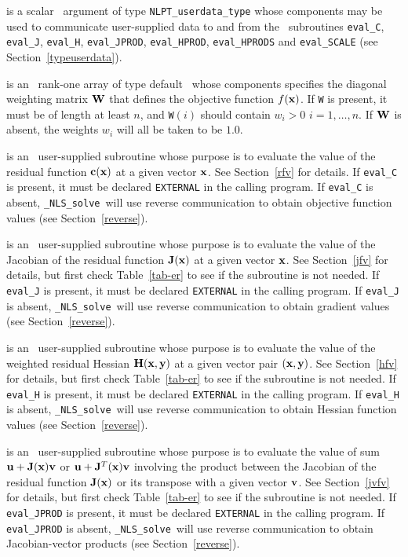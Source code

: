 \documentclass{galahad}
\newcommand{\packagename}{NLS}
\newcommand{\fullpackagename}{\libraryname\_\packagename}
\newcommand{\solver}{{\tt \fullpackagename\_solve}}
\begin{document}
\begin{description}
 is a scalar \intentinout\ argument of type
{\tt NLPT\_userdata\_type} whose components may be used
to communicate user-supplied data to and from the \optional\ subroutines
{\tt eval\_C}, {\tt eval\_J}, {\tt eval\_H}, {\tt eval\_JPROD},
{\tt eval\_HPROD}, {\tt eval\_HPRODS} and {\tt eval\_SCALE}
(see Section~\ref{typeuserdata}).

 is an \optional\ rank-one array of type default \realdp\
whose components specifies the diagonal weighting matrix ${\mathbf{W}}$ that
defines the objective function $f({\mathbf{x}})$. If {\tt W} is present, it
must be of length at least $n$, and {\tt W}$(i)$ should contain $w_i > 0$
$i = 1, \ldots, n$. If ${\mathbf{W}}$ is absent, the weights $w_i$ will all be
taken to be $1.0$.

 is an \optional\
user-supplied subroutine whose purpose is to evaluate the value of the
residual function ${\mathbf{c}}({\mathbf{x}})$ at a given vector ${\mathbf{x}}$.
See Section~\ref{rfv} for details.
If {\tt eval\_C} is present,
it must be declared {\tt EXTERNAL} in the calling program.
If {\tt eval\_C} is absent, \solver\ will use reverse communication to
obtain objective function values (see Section~\ref{reverse}).

 is an \optional\
user-supplied subroutine whose purpose is to evaluate the value of the
Jacobian of the residual function ${\mathbf{J}}({\mathbf{x}})$ at a given vector ${\mathbf{x}}$.
See Section~\ref{jfv} for details,
but first check Table~\ref{tab-er} to see if the subroutine is not needed.
If {\tt eval\_J} is present,
it must be declared {\tt EXTERNAL} in the calling program.
If {\tt eval\_J} is absent, \solver\ will use reverse communication to
obtain gradient values (see Section~\ref{reverse}).

\itt{eval\_H} is an \optional\
user-supplied subroutine whose purpose is to evaluate the value of the
weighted residual Hessian ${\mathbf{H}}({\mathbf{x}},{\mathbf{y}})$ at a given vector pair
$({\mathbf{x}},{\mathbf{y}})$. See Section~\ref{hfv} for details,
but first check Table~\ref{tab-er} to see if the subroutine is not needed.
If {\tt eval\_H} is present,
it must be declared {\tt EXTERNAL} in the calling program.
If {\tt eval\_H} is absent, \solver\ will use reverse communication to
obtain Hessian function values (see Section~\ref{reverse}).

\itt{eval\_JPROD} is an \optional\
user-supplied subroutine whose purpose is to evaluate the value of sum
${\mathbf{u}} + {\mathbf{J}}({\mathbf{x}}){\mathbf{v}}$ or ${\mathbf{u}} + {\mathbf{J}}^T({\mathbf{x}}){\mathbf{v}}$ involving the
product between the Jacobian of the
residual function ${\mathbf{J}}({\mathbf{x}})$ or its transpose with a given vector ${\mathbf{v}}$.
See Section~\ref{jvfv} for details,
but first check Table~\ref{tab-er} to see if the subroutine is not needed.
If {\tt eval\_JPROD} is present,
it must be declared {\tt EXTERNAL} in the calling program.
If {\tt eval\_JPROD} is absent, \solver\ will use reverse communication to
obtain Jacobian-vector products (see Section~\ref{reverse}).


\end{description}
\end{document}
